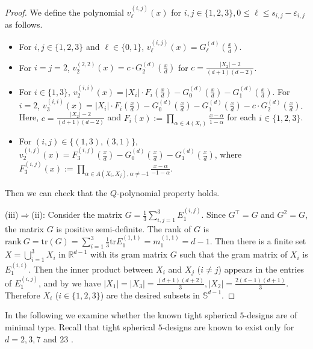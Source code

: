 \documentclass[11pt]{article}
\theoremstyle{definition}
\theoremstyle{remark}
\begin{document}
\begin{proof}
We define the polynomial ${v}_\ell^{(i,j)}(x)$ for $i,j\in\{1,2,3\}, 0\leq \ell \leq s_{i,j}-\varepsilon_{i,j}$ as follows.
\begin{itemize}
\item For $i,j\in\{1,2,3\}$ and $\ell\in\{0,1\}$,  $v_\ell^{(i,j)}(x)=G_\ell^{(d)}(\frac{x}{d})$.
\item For $i=j=2$, $v_2^{(2,2)}(x)=c\cdot G_2^{(d)}(\frac{x}{d})$ for $c=\frac{|X_2|-2}{(d+1)(d-2)}$. 
\item For $i\in\{1,3\}$, $v_{2}^{(i,i)}(x)=|X_i|\cdot F_i(\frac{x}{d})-G_0^{(d)}(\frac{x}{d})-G_1^{(d)}(\frac{x}{d})$. For $i=2$, $v_{3}^{(i,i)}(x)=|X_i|\cdot F_i(\frac{x}{d})-G_0^{(d)}(\frac{x}{d})-G_1^{(d)}(\frac{x}{d})-c\cdot G_2^{(d)}(\frac{x}{d})$. Here, $c=\frac{|X_2|-2}{(d+1)(d-2)}$ and  $F_i(x):=\prod_{\alpha\in A(X_i)}\frac{x-\alpha}{1-\alpha}$ for each $i\in\{1,2,3\}$.
\item For $(i,j)\in \{(1,3),(3,1)\}$, $v_{2}^{(i,j)}(x)=F_3^{(i,j)}(\frac{x}{d})-G_0^{(d)}(\frac{x}{d})-G_1^{(d)}(\frac{x}{d})$, where $F_3^{(i,j)}(x):=\prod_{\alpha\in A(X_i,X_j),\alpha\neq -1}\frac{x-\alpha}{-1-\alpha}$. 
\end{itemize}
Then we can check that the $Q$-polynomial property holds. 

(iii)$\Rightarrow$(ii): 
Consider the matrix $G=\frac{1}{3}\sum_{i,j=1}^3 E_1^{(i,j)}$. Since $G^\top=G$ and $G^2=G$, the matrix $G$ is positive semi-definite. 
The rank of $G$ is $\mathrm{rank}\ G=\mathrm{tr}(G)=\sum_{i=1}^3 \frac{1}{3}\mathrm{tr}E_{1}^{(1,1)}=m_1^{(1,1)}=d-1$. 
Then there is a finite set $X=\bigcup_{i=1}^3 X_i$ in $\mathbb{R}^{d-1}$ with its gram matrix $G$ such that the gram matrix of $X_i$ is $E_1^{(i,i)}$. 
Then the inner product between $X_i$ and $X_j$ ($i\neq j$) appears in the entries of $E_1^{(i,j)}$, and by \cite{BI84} we have $|X_1|=|X_3|=\frac{(d+1)(d+2)}{3},|X_2|=\frac{2(d-1)(d+1)}{3}$. 
Therefore $X_i$ ($i\in\{1,2,3\}$) are the desired subsets in $\mathbb{S}^{d-1}$. 
\end{proof}


In the following we examine whether the known tight spherical $5$-designs are of minimal type.
Recall that tight spherical $5$-designs are known to exist only for $d=2,3,7$ and $23$ \cite{BB09b}. 
\end{document}
